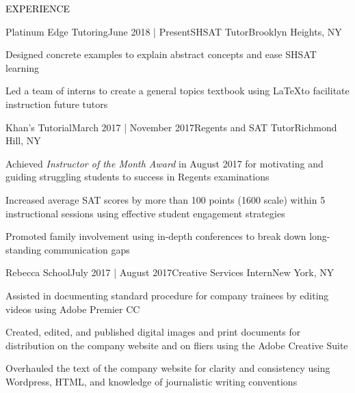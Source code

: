\documentclass{resume} %
\renewenvironment{rSection}[1]{
\sectionskip
\textcolor{Black}{\MakeUppercase{#1}}
\sectionlineskip
\begin{list}{}{
\setlength{\leftmargin}{1.5em}
}
\item[]
}{
\end{list}
}
\begin{document}
\begin{rSection}{Experience}
  \begin{rSubsection}{Platinum Edge Tutoring}{June 2018 | Present}{SHSAT Tutor}{Brooklyn Heights, NY}
    \item Designed concrete examples to explain abstract concepts and ease SHSAT learning
    \item Led a team of interns to create a general topics textbook using \LaTeX \hspace{.7ex}to facilitate instruction future tutors 
  \end{rSubsection}
  \begin{rSubsection}{Khan's Tutorial}{March 2017 | November 2017}{Regents and SAT Tutor}{Richmond Hill, NY}
    \item Achieved {\em Instructor of the Month Award} in August 2017 for motivating and guiding struggling students to success in Regents examinations
    \item Increased average SAT scores by more than 100 points (1600 scale) within 5
      instructional sessions using effective student engagement strategies
    \item Promoted family involvement using in-depth conferences to break down long-standing communication gaps
  \end{rSubsection}

  \begin{rSubsection}{Rebecca School}{July 2017 | August 2017}{Creative Services Intern}{New York, NY}
    \item Assisted in documenting standard procedure for company trainees by editing videos using Adobe Premier CC %
    \item Created, edited, and published digital images and print documents for distribution on the company website and on fliers using the Adobe Creative Suite
    \item Overhauled the text of the company website for clarity and consistency using Wordpress, HTML, and knowledge of journalistic writing conventions
  \end{rSubsection}


\end{rSection}
\end{document}
